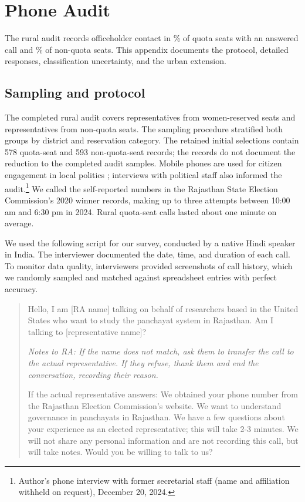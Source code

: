 \clearpage
\section{Phone Audit}\label{sec:app_phone}
\suppressfloats[t]

The rural audit records officeholder contact in \phoneQuotaMemberPct{}\% of quota seats with an answered call and \phoneOpenMemberPct{}\% of non-quota seats. This appendix documents the protocol, detailed responses, classification uncertainty, and the urban extension.

\subsection{Sampling and protocol}\label{sec:phone_survey_script}

The completed rural audit covers \phoneQuotaSampled{} representatives from women-reserved seats and \phoneOpenSampled{} representatives from non-quota seats. The sampling procedure stratified both groups by district and reservation category. The retained initial selections contain 578 quota-seat and 593 non-quota-seat records; the records do not document the reduction to the completed audit samples. Mobile phones are used for citizen engagement in local politics \citep{rigillo2018whatsapp}; interviews with political staff also informed the audit.\footnote{Author's phone interview with former secretarial staff (name and affiliation withheld on request), December 20, 2024.} We called the self-reported numbers in the Rajasthan State Election Commission's 2020 winner records, making up to three attempts between 10:00 am and 6:30 pm in 2024. Rural quota-seat calls lasted about one minute on average.

We used the following script for our survey, conducted by a native Hindi speaker in India. The interviewer documented the date, time, and duration of each call. To monitor data quality, interviewers provided screenshots of call history, which we randomly sampled and matched against spreadsheet entries with perfect accuracy.

\begin{quote}
Hello, I am [RA name] talking on behalf of researchers based in the United States who want to study the panchayat system in Rajasthan. Am I talking to [representative name]?

\medskip
\textit{Notes to RA: If the name does not match, ask them to transfer the call to the actual representative. If they refuse, thank them and end the conversation, recording their reason.}

\medskip
If the actual representative answers: We obtained your phone number from the Rajasthan Election Commission's website. We want to understand governance in panchayats in Rajasthan. We have a few questions about your experience as an elected representative; this will take 2-3 minutes. We will not share any personal information and are not recording this call, but will take notes. Would you be willing to talk to us?
\end{quote}

